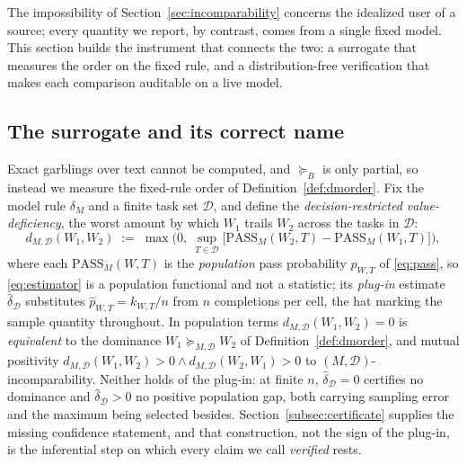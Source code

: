 \documentclass[11pt]{article}
\theoremstyle{plain}
\theoremstyle{definition}
\theoremstyle{remark}
\newcommand{\PASS}{\mathrm{PASS}}
\newcommand{\dhat}{\widehat{\delta}}
\newcommand{\Dcal}{\mathcal{D}}
\newcommand{\Bord}{\succeq_{B}}
\begin{document}
The impossibility of Section~\ref{sec:incomparability} concerns the idealized user of a source; every
quantity we report, by contrast, comes from a single fixed model. This section builds the
instrument that connects the two: a surrogate that measures the order on the fixed rule, and a
distribution-free verification that makes each comparison auditable on a live model.

\subsection{The surrogate and its correct name}
\label{subsec:estimator-name}

Exact garblings over text cannot be computed, and $\Bord$ is only partial, so instead we measure the
fixed-rule order of Definition~\ref{def:dmorder}. Fix the model rule $\delta_M$ and a finite task
set $\Dcal$, and define the \emph{decision-restricted value-deficiency}, the worst amount by which
$W_1$ trails $W_2$ across the tasks in $\Dcal$:
\begin{equation}
\label{eq:estimator}
d_{M,\Dcal}(W_1,W_2) \;:=\; \max\!\Big(0,\ \sup_{T\in \Dcal}\big[\PASS_M(W_2,T)-\PASS_M(W_1,T)\big]\Big),
\end{equation}
where each $\PASS_M(W,T)$ is the \emph{population} pass probability $p_{W,T}$ of \eqref{eq:pass},
so \eqref{eq:estimator} is a population functional and not a statistic; its \emph{plug-in}
estimate $\dhat_{\Dcal}$ substitutes $\hat p_{W,T} = k_{W,T}/n$ from $n$ completions per cell, the
hat marking the sample quantity throughout. In population terms $d_{M,\Dcal}(W_1,W_2)=0$ is
\emph{equivalent} to the dominance $W_1 \succeq_{M,\Dcal} W_2$ of Definition~\ref{def:dmorder},
and mutual positivity $d_{M,\Dcal}(W_1,W_2)>0 \wedge d_{M,\Dcal}(W_2,W_1)>0$ to
$(M,\Dcal)$-incomparability. Neither holds of the plug-in: at finite $n$, $\dhat_{\Dcal}=0$
certifies no dominance and $\dhat_{\Dcal}>0$ no positive population gap, both carrying sampling
error and the maximum being selected besides. Section~\ref{subsec:certificate} supplies the
missing confidence statement, and that construction, not the sign of the plug-in, is the
inferential step on which every claim we call \emph{verified} rests.
\end{document}

